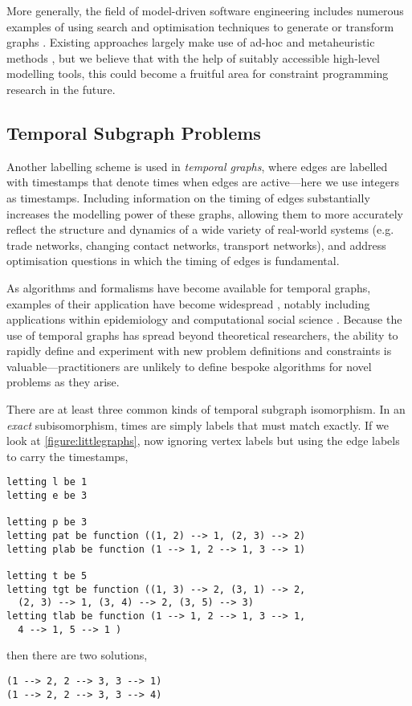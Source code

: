 \documentclass[runningheads]{llncs}
\begin{document}
More generally, the field of model-driven software engineering includes numerous examples of using
search and optimisation techniques to generate or transform graphs
\cite{DBLP:journals/ase/BoussaidSA17}. Existing approaches largely make use of ad-hoc
\cite{DBLP:conf/icse/SemerathNV18} and metaheuristic methods
\cite{DBLP:conf/models/EfstathiouWZ14,DBLP:journals/sosym/BillFTMW19,DBLP:conf/models/BurduselZ019},
but we believe that with the help of suitably accessible high-level modelling tools, this could
become a fruitful area for constraint programming research in the future.

\subsection{Temporal Subgraph Problems}\label{section:temporalgraphs}

Another labelling scheme is used in \emph{temporal graphs}, where edges are labelled with timestamps
that denote times when edges are active---here we use integers as timestamps.  Including information
on the timing of edges substantially increases the modelling power of these graphs, allowing them to
more accurately reflect the structure and dynamics of a wide variety of real-world systems (e.g.
trade networks, changing contact networks, transport networks), and address optimisation questions
in which the timing of edges is fundamental.

As algorithms and formalisms have become available for temporal graphs, examples of their
application have become widespread \cite{holmeReview}, notably including applications within
epidemiology \cite{temporalEpi} and computational social science \cite{socialTemporalCite}.  Because
the use of temporal graphs has spread beyond theoretical researchers, the ability to rapidly define
and experiment with new problem definitions and constraints is valuable---practitioners are unlikely
to define bespoke algorithms for novel problems as they arise.

There are at least three common kinds of temporal subgraph isomorphism. In an \emph{exact}
subisomorphism, times are simply labels that must match exactly. If we look at
\cref{figure:littlegraphs}, now ignoring vertex labels but using the edge labels to carry the
timestamps,
\begin{lstlisting}
letting l be 1
letting e be 3

letting p be 3
letting pat be function ((1, 2) --> 1, (2, 3) --> 2)
letting plab be function (1 --> 1, 2 --> 1, 3 --> 1)

letting t be 5
letting tgt be function ((1, 3) --> 2, (3, 1) --> 2,
  (2, 3) --> 1, (3, 4) --> 2, (3, 5) --> 3)
letting tlab be function (1 --> 1, 2 --> 1, 3 --> 1,
  4 --> 1, 5 --> 1 )
\end{lstlisting}
then there are two solutions,
\begin{lstlisting}
(1 --> 2, 2 --> 3, 3 --> 1)
(1 --> 2, 2 --> 3, 3 --> 4)
\end{lstlisting}
\end{document}
